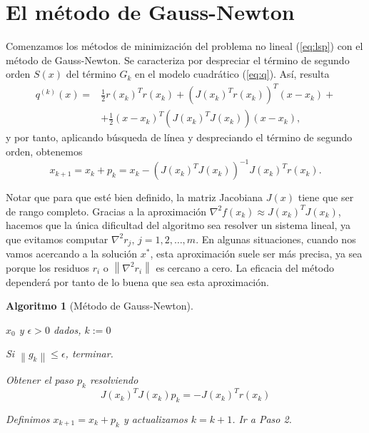 \documentclass[11pt,a4paper]{book}
\newtheorem{algorithm}[theorem]{Algoritmo}
\theoremstyle{definition}
\theoremstyle{remark}
\newcommand{\norm}[1]{\left\lVert#1\right\rVert}
\begin{document}
\section{El método de Gauss-Newton}

Comenzamos los métodos de minimización del problema no lineal (\ref{eq:lsp}) con el método de Gauss-Newton. Se caracteriza por despreciar el término de segundo orden $S(x)$ del término $G_k$ en el modelo cuadrático (\ref{eq:q}). Así, resulta
\begin{equation}
\begin{split}
q^{(k)}(x) =& \frac{1}{2}r(x_k)^Tr(x_k)+(J(x_k)^Tr(x_k))^T(x-x_k)+ \\
	& +\frac{1}{2}(x-x_k)^T(J(x_k)^TJ(x_k))(x-x_k),
\end{split}
\end{equation}
y por tanto, aplicando búsqueda de línea y despreciando el término de segundo orden, obtenemos
\begin{equation}
	x_{k+1} = x_k + p_k = x_k -(J(x_k)^TJ(x_k))^{-1}J(x_k)^Tr(x_k).
\end{equation}

Notar que para que esté bien definido, la matriz Jacobiana $J(x)$ tiene que ser de rango completo. Gracias a la aproximación $\nabla^2 f(x_k) \approx J(x_k)^TJ(x_k)$, hacemos que la única dificultad del algoritmo sea resolver un sistema lineal, ya que evitamos computar $\nabla^2 r_j,\,j=1,2,\ldots ,m$. En algunas situaciones, cuando nos vamos acercando a la solución $x^*$, esta aproximación suele ser más precisa, ya sea porque los residuos $r_i$ o $\norm{\nabla^2 r_i}$ es cercano a cero. La eficacia del método dependerá por tanto de lo buena que sea esta aproximación.

\begin{algorithm}[Método de Gauss-Newton] \leavevmode
\label{al:g-n}
\begin{steps}
	\item $x_0$ y $\epsilon > 0$ dados, $k:=0$
	\item Si $\norm{g_k} \leq \epsilon$, terminar.
	\item Obtener el paso $p_k$ resolviendo
		\begin{equation}
			J(x_k)^TJ(x_k)p_k = -J(x_k)^Tr(x_k)
		\end{equation}
	\item Definimos $x_{k+1} = x_k + p_k$ y actualizamos $k=k+1$. Ir a Paso 2. \quad \qedsymbol
\end{steps}
\end{algorithm}
\end{document}
